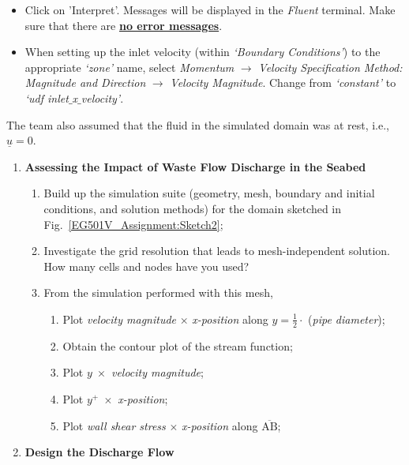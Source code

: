 \documentclass[12pts,a4paper,amsmath,amssymb,floatfix]{article}%
\newcommand{\frc}{\displaystyle\frac}
\begin{document}
\begin{enumerate}[label=\bfseries Problem \arabic*:]
\begin{itemize}
\begin{itemize}
        \item Click on 'Interpret'. Messages will be displayed in the {\it Fluent} terminal. Make sure that there are {\bf \underline{no error messages}}.
        \item When setting up the inlet velocity (within {\it `Boundary Conditions'}) to the appropriate {\it `zone'} name, select {\it Momentum} $\rightarrow$ {\it Velocity Specification Method: Magnitude and Direction} $\rightarrow$ {\it Velocity Magnitude}. Change from {\it `constant'} to {\it `udf inlet$\_$x$\_$velocity'}.
    \end{itemize}
\end{itemize}
The team also assumed that the fluid in the simulated domain was at rest, i.e., $\underline{u}=0$.



\begin{enumerate}[label=\bfseries Task 2.\arabic*]

\item\label{Practical2:Task1} {\bf Assessing the Impact of Waste Flow Discharge in the Seabed}
  \begin{enumerate}
  \item Build up the simulation suite (geometry, mesh, boundary and initial conditions, and solution methods) for the domain sketched in Fig.~\ref{EG501V_Assignment:Sketch2};
     \item Investigate the grid resolution that leads to mesh-independent solution. How many cells and nodes have you used?
     \item From the simulation performed with this mesh,
         \begin{enumerate}
            \item Plot {\it velocity magnitude} $\times$ {\it x-position} along $y =\frc{1}{2}\cdot$ ({\it pipe diameter});
            \item Obtain the contour plot of the stream function;
            \item Plot $y \;\times$ {\it velocity magnitude};
            \item Plot $y^{+}\;\times$ {\it x-position};
            \item Plot {\it wall shear stress} $\times$ {\it x-position} along $\overline{\text{AB}}$;
         \end{enumerate}
  \end{enumerate}


\item\label{Practical2:Task2} {\bf Design the Discharge Flow}


\end{enumerate}
\end{enumerate}
\end{document}
